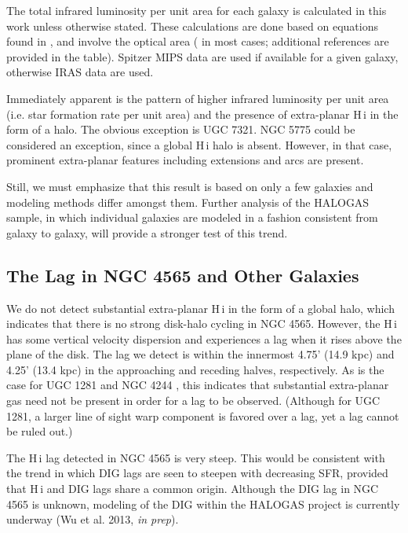 \documentclass{emulateapj}
\begin{document}
\par  
    The total infrared luminosity per unit area for each galaxy is calculated in this work unless otherwise stated.  These calculations are done based on equations found in \citet{2009ApJ...703..517D}, and involve the optical area (\citealt{1991trcb.book.....D} in most cases; additional references are provided in the table).  Spitzer MIPS data are used if available for a given galaxy, otherwise IRAS data are used. 

\par
    Immediately apparent is the pattern of higher infrared luminosity per unit area (i.e. star formation rate per unit area) and the presence of extra-planar {\sc H\,i} in the form of a halo.  The obvious exception is UGC 7321.  NGC 5775 could be considered an exception, since a global {\sc H\,i} halo is absent.  However, in that case, prominent extra-planar features including extensions and arcs are present. 

\par
    Still, we must emphasize that this result is based on only a few galaxies and modeling methods differ amongst them.  Further analysis of the HALOGAS sample, in which individual galaxies are modeled in a fashion consistent from galaxy to galaxy, will provide a stronger test of this trend.



\subsection{The Lag in NGC 4565 and Other Galaxies}\label{Section6.4}

\par
     We do not detect substantial extra-planar {\sc H\,i} in the form of a global halo, which indicates that there is no strong disk-halo cycling in NGC 4565.  However, the {\sc H\,i} has some vertical velocity dispersion and experiences a lag when it rises above the plane of the disk.  The lag we detect is within the innermost 4.75' (14.9 kpc) and 4.25' (13.4 kpc) in the approaching and receding halves, respectively.  As is the case for UGC 1281 \citep{2011MNRAS.414.3444K} and NGC 4244 \citep{2011ApJ...740...35Z}, this indicates that substantial extra-planar gas need not be present in order for a lag to be observed.  (Although for UGC 1281, a larger line of sight warp component is favored over a lag, yet a lag cannot be ruled out.) 

\par
    The {\sc H\,i} lag detected in NGC 4565 is very steep.  This would be consistent with the \citet{2007ApJ...663..933H} trend in which DIG lags are seen to steepen with decreasing SFR, provided that {\sc H\,i} and DIG lags share a common origin.  Although the DIG lag in NGC 4565 is unknown, modeling of the DIG within the HALOGAS project is currently underway (Wu et al. 2013, \textit{in prep}).  
\end{document}
